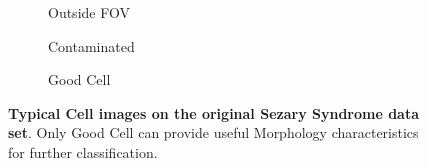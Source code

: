 \begin{figure}[ht]
\begin{center}
\begin{subfigure}[b]{0.33\textwidth}
			\caption{Outside FOV}
			\label{fig:Outside FOV}
		\end{subfigure}
		\begin{subfigure}[b]{0.33\textwidth}
			\caption{Contaminated}
			\label{fig:Contaminated}
		\end{subfigure}
		\begin{subfigure}[b]{0.33\textwidth}
			\caption{Good Cell}
			\label{fig:Good Cell}
		\end{subfigure}
	\end{center}
	\caption{\textbf{Typical Cell images on the original Sezary Syndrome data set}. Only Good Cell can provide useful Morphology characteristics for further classification.}
	\label{fig:1.1}
\end{figure}

